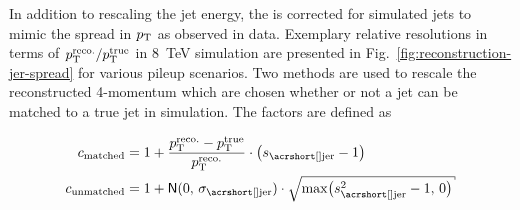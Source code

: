 
In addition to rescaling the jet energy, the  is corrected for simulated jets to mimic the spread in $p_\textrm{T}$ as observed in data. Exemplary relative resolutions in terms of $p_\textrm{T}^\mathrm{reco.}/p_\textrm{T}^\mathrm{true}$ in 8~TeV simulation are presented in Fig.~\ref{fig:reconstruction-jer-spread} for various pileup scenarios. Two methods are used to rescale the reconstructed 4-momentum which are chosen whether or not a jet can be matched to a true jet in simulation. The factors are defined as

\begin{align}
c_\mathrm{matched}&=1+\frac{\pt^\mathrm{reco.}-\pt^\mathrm{true}}{\pt^\mathrm{reco.}}\cdot\big(s_\mathrm{\gls{jer}}-1\big)\\ c_\mathrm{unmatched}&=1+\mathsf{N}(0,\,\sigma_\mathrm{\gls{jer}})\cdot\sqrt{\mathrm{max}\big(s_\mathrm{\gls{jer}}^2-1,\,0\big)}
\end{align}

